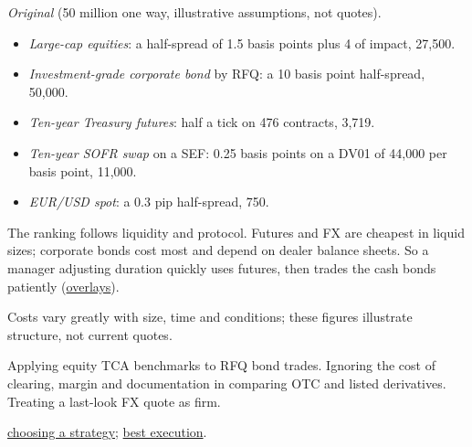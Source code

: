 \begin{qfdefinition}
 \emph{Original} (50 million one way, illustrative assumptions, not quotes).
\begin{itemize}
\item \emph{Large-cap equities}: a half-spread of 1.5 basis points plus 4 of impact, 27{,}500.
\item \emph{Investment-grade corporate bond} by RFQ: a 10 basis point half-spread, 50{,}000.
\item \emph{Ten-year Treasury futures}: half a tick on 476 contracts, 3{,}719.
\item \emph{Ten-year SOFR swap} on a SEF: 0.25 basis points on a DV01 of 44{,}000 per basis point, 11{,}000.
\item \emph{EUR/USD spot}: a 0.3 pip half-spread, 750.
\end{itemize}
The ranking follows liquidity and protocol. Futures and FX are cheapest in liquid sizes; corporate bonds cost most and depend on dealer balance sheets. So a manager adjusting duration quickly uses futures, then trades the cash bonds patiently (\hyperref[ex:endowment-derivative-overlay-case]{overlays}).

 Costs vary greatly with size, time and conditions; these figures illustrate structure, not current quotes.

 Applying equity TCA benchmarks to RFQ bond trades. Ignoring the cost of clearing, margin and documentation in comparing OTC and listed derivatives. Treating a last-look FX quote as firm.

 \hyperref[meth:trade-strategy-selection]{choosing a strategy}; \hyperref[def:best-execution]{best execution}.

\end{qfdefinition}
